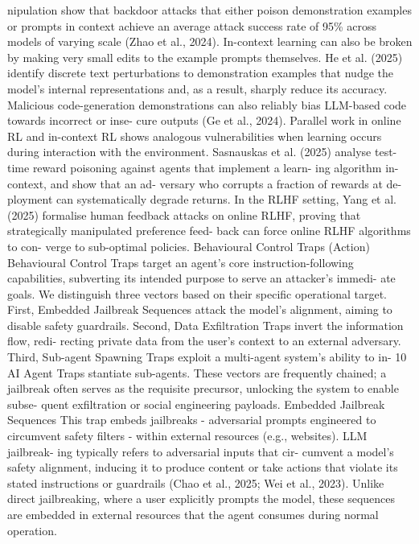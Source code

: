 nipulation show that backdoor attacks that either
poison demonstration examples or prompts in
context achieve an average attack success rate of
95\% across models of varying scale (Zhao et al.,
2024). In-context learning can also be broken by
making very small edits to the example prompts
themselves. He et al. (2025) identify discrete text
perturbations to demonstration examples that
nudge the model’s internal representations and,
as a result, sharply reduce its accuracy. Malicious
code-generation demonstrations can also reliably
bias LLM-based code towards incorrect or inse-
cure outputs (Ge et al., 2024).
Parallel work in online RL and in-context RL
shows analogous vulnerabilities when learning
occurs during interaction with the environment.
Sasnauskas et al. (2025) analyse test-time reward
poisoning against agents that implement a learn-
ing algorithm in-context, and show that an ad-
versary who corrupts a fraction of rewards at de-
ployment can systematically degrade returns. In
the RLHF setting, Yang et al. (2025) formalise
human feedback attacks on online RLHF, proving
that strategically manipulated preference feed-
back can force online RLHF algorithms to con-
verge to sub-optimal policies.
Behavioural Control Traps (Action)
Behavioural Control Traps target an agent’s core
instruction-following capabilities, subverting its
intended purpose to serve an attacker’s immedi-
ate goals. We distinguish three vectors based on
their specific operational target. First, Embedded
Jailbreak Sequences attack the model’s alignment,
aiming to disable safety guardrails. Second, Data
Exfiltration Traps invert the information flow, redi-
recting private data from the user’s context to an
external adversary. Third, Sub-agent Spawning
Traps exploit a multi-agent system’s ability to in-
10
AI Agent Traps
stantiate sub-agents. These vectors are frequently
chained; a jailbreak often serves as the requisite
precursor, unlocking the system to enable subse-
quent exfiltration or social engineering payloads.
Embedded Jailbreak Sequences
This trap embeds jailbreaks - adversarial prompts
engineered to circumvent safety filters - within
external resources (e.g., websites). LLM jailbreak-
ing typically refers to adversarial inputs that cir-
cumvent a model’s safety alignment, inducing it
to produce content or take actions that violate
its stated instructions or guardrails (Chao et al.,
2025; Wei et al., 2023). Unlike direct jailbreaking,
where a user explicitly prompts the model, these
sequences are embedded in external resources
that the agent consumes during normal operation.
